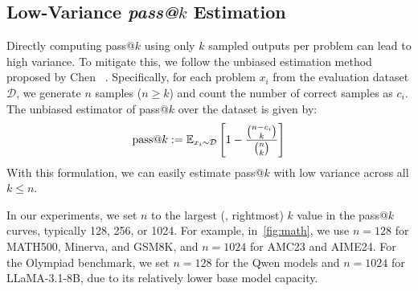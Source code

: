 \subsection{Low-Variance \textit{pass@$k$} Estimation}
\label{appendix:passk_est}
Directly computing pass@$k$ using only $k$ sampled outputs per problem can lead to high variance.  
To mitigate this, we follow the unbiased estimation method proposed by Chen \etal~\cite{chen2021evaluating}.  
Specifically, for each problem $x_i$ from the evaluation dataset $\mathcal{D}$, we generate $n$ samples ($n \geq k$) and count the number of correct samples as $c_i$.  
The unbiased estimator of pass@$k$ over the dataset is given by:
\begin{equation}
\setlength\abovedisplayskip{2pt}
\setlength\belowdisplayskip{2pt}
\text{pass@}k := \mathbb{E}_{x_i \sim \mathcal{D}} \left[ 1 - \frac{\binom{n - c_i}{k}}{\binom{n}{k}} \right]
\end{equation}
With this formulation, we can easily estimate pass@$k$ with low variance across all $k \leq n$.

In our experiments, we set $n$ to the largest (\ie, rightmost) $k$ value in the pass@$k$ curves, typically 128, 256, or 1024. For example, in~\cref{fig:math}, we use $n = 128$ for MATH500, Minerva, and GSM8K, and $n = 1024$ for AMC23 and AIME24. For the Olympiad benchmark, we set $n = 128$ for the Qwen models and $n = 1024$ for LLaMA-3.1-8B, due to its relatively lower base model capacity.






